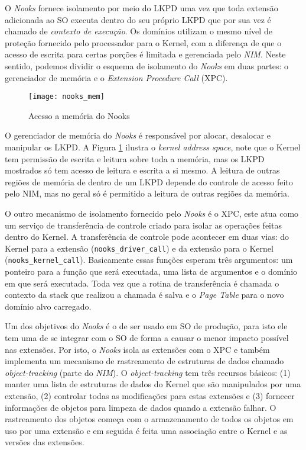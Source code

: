 O \emph{Nooks} fornece isolamento por meio do LKPD uma vez que toda extensão
adicionada ao SO executa dentro do seu próprio LKPD que por sua vez é chamado
de \emph{contexto de execução}. Os domínios utilizam o mesmo nível de proteção
fornecido pelo processador para o Kernel, com a diferença de que o acesso de
escrita para certas porções é limitada e gerenciada pelo \emph{NIM}. Neste
sentido, podemos dividir o esquema de isolamento do \emph{Nooks} em duas partes:
o gerenciador de memória e o \emph{Extension Procedure Call} (XPC).

\begin{figure}[!h]
  \centering
  \texttt{[image: nooks\_mem]}
  \caption{Acesso a memória do Nooks \citep{nooks}}
  \label{fig:nooks_mem}
\end{figure}

O gerenciador de memória do \emph{Nooks} é responsável por alocar, desalocar e
manipular os LKPD. A Figura \ref{fig:nooks_mem} ilustra o \textit{kernel
address space}, note que o Kernel tem permissão de escrita e leitura sobre toda
a memória, mas os LKPD mostrados só tem acesso de leitura e escrita a si mesmo.
A leitura de outras regiões de memória de dentro de um LKPD depende do controle
de acesso feito pelo NIM, mas no geral só é permitido a leitura de outras
regiões da memória.

O outro mecanismo de isolamento fornecido pelo \emph{Nooks} é o XPC, este atua
como um serviço de transferência de controle criado para isolar as operações
feitas dentro do Kernel. A transferência de controle pode acontecer em duas
vias: do Kernel para a extensão (\texttt{nooks\_driver\_call}) e da extensão
para o Kernel (\texttt{nooks\_kernel\_call}). Basicamente essas funções esperam
três argumentos: um ponteiro para a função que será executada, uma lista de
argumentos e o domínio em que será executada. Toda vez que a rotina de
transferência é chamada o contexto da stack que realizou a chamada é salva e o
\emph{Page Table} para o novo domínio alvo carregado.

Um dos objetivos do \emph{Nooks} é o de ser usado em SO de produção, para isto
ele tem uma de se integrar com o SO de forma a causar o menor impacto possível
nas extensões. Por isto, o \emph{Nooks} isola as extensões com o XPC e também
implementa um mecanismo de rastreamento de estruturas de dados chamado
\emph{object-tracking} (parte do \emph{NIM}). O \emph{object-tracking} tem três
recursos básicos: (1) manter uma lista de estruturas de dados do Kernel que são
manipulados por uma extensão, (2) controlar todas as modificações para estas
extensões e (3) fornecer informações de objetos para limpeza de dados quando a
extensão falhar. O rastreamento dos objetos começa com o armazenamento de todos
os objetos em uso por uma extensão e em seguida é feita uma associação entre o
Kernel e as versões das extensões.

